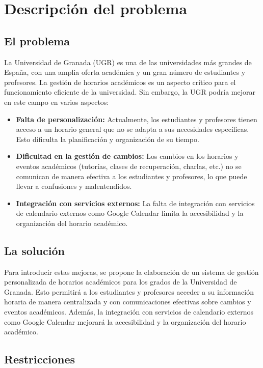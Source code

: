 \chapter{Descripción del problema}\label{cap:descripcion}

\section{El problema}

La Universidad de Granada (UGR) es una de las universidades más grandes de España, con una amplia oferta académica y un gran número de estudiantes y profesores. La gestión de horarios académicos es un aspecto crítico para el funcionamiento eficiente de la universidad. Sin embargo, la UGR podría mejorar en este campo en varios aspectos:

\begin{itemize}
    \item \textbf{Falta de personalización:} Actualmente, los estudiantes y profesores tienen acceso a un horario general que no se adapta a sus necesidades específicas. Esto dificulta la planificación y organización de su tiempo.
    \item \textbf{Dificultad en la gestión de cambios:} Los cambios en los horarios y eventos académicos (tutorías, clases de recuperación, charlas, etc.) no se comunican de manera efectiva a los estudiantes y profesores, lo que puede llevar a confusiones y malentendidos.
    \item \textbf{Integración con servicios externos:} La falta de integración con servicios de calendario externos como Google Calendar limita la accesibilidad y la organización del horario académico.
\end{itemize}

\section{La solución}

Para introducir estas mejoras, se propone la elaboración de un sistema de gestión personalizada de horarios académicos para los grados de la Universidad de Granada. 
Esto permitirá a los estudiantes y profesores acceder a su información horaria de manera centralizada y con comunicaciones efectivas sobre cambios y eventos académicos. Además, la integración con servicios de calendario externos como Google Calendar mejorará la accesibilidad y la organización del horario académico.

\section{Restricciones}

